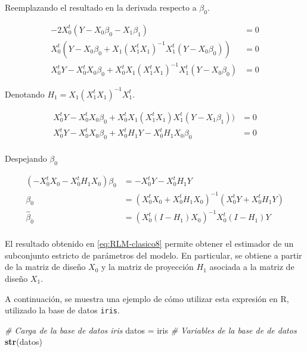\documentclass[
  11pt,
]{book}
\newenvironment{Shaded}{\begin{snugshade}}{\end{snugshade}}
\newcommand{\CommentTok}[1]{\textcolor[rgb]{0.56,0.35,0.01}{\textit{#1}}}
\newcommand{\FunctionTok}[1]{\textcolor[rgb]{0.13,0.29,0.53}{\textbf{#1}}}
\newcommand{\NormalTok}[1]{#1}
\newcommand{\OtherTok}[1]{\textcolor[rgb]{0.56,0.35,0.01}{#1}}
\theoremstyle{definition}
\theoremstyle{definition}
\theoremstyle{definition}
\theoremstyle{definition}
\theoremstyle{remark}
\begin{document}
Reemplazando el resultado en la derivada respecto a \(\beta_0\).

\begin{equation}
\begin{split}
-2X^t_0(Y-X_0\beta_0-X_1\beta_1) &= 0\\
X^t_0(Y-X_0\beta_0+X_1(X_1^tX_1)^{-1}X_1^t(Y-X_0\beta_0)) &= 0\\
X^t_0Y-X^t_0X_0\beta_0+X^t_0X_1(X_1^tX_1)^{-1}X_1^t(Y-X_0\beta_0) &= 0
\end{split}
\label{eq:RLM-clasico6}
\end{equation}

Denotando \(H_1 = X_1(X_1^tX_1)^{-1}X_1^t\).

\begin{equation}
\begin{split}
X^t_0Y-X^t_0X_0\beta_0+X^t_0X_1(X_1^tX_1)X_1^t(Y-X_1\beta_1)) &= 0\\
X^t_0Y-X^t_0X_0\beta_0+X^t_0H_1Y-X^t_0H_1X_0\beta_0 &= 0\\
\end{split}
\label{eq:RLM-clasico7}
\end{equation}

Despejando \(\beta_0\)

\begin{equation}
\begin{split}
(-X^t_0X_0-X^t_0H_1X_0)\beta_0 &= -X^t_0Y - X^t_0H_1Y\\
\beta_0 &= (X^t_0X_0 + X^t_0H_1X_0)^{-1}(X^t_0Y + X^t_0H_1Y)\\
\widehat{\beta}_0 &= (X^t_0(I-H_1)X_0)^{-1}X^t_0(I-H_1)Y\\
\end{split}
\label{eq:RLM-clasico8}
\end{equation}

El resultado obtenido en \eqref{eq:RLM-clasico8} permite obtener el estimador de un subconjunto estricto de parámetros del modelo. En particular, se obtiene a partir de la matriz de diseño \(X_0\) y la matriz de proyección \(H_1\) asociada a la matriz de diseño \(X_1\).

A continuación, se muestra una ejemplo de cómo utilizar esta expresión en R, utilizado la base de datos \texttt{iris}.

\begin{Shaded}
\begin{Highlighting}[]
\CommentTok{\# Carga de la base de datos iris}
\NormalTok{datos }\OtherTok{=}\NormalTok{ iris}
\CommentTok{\# Variables de la base de de datos}
\FunctionTok{str}\NormalTok{(datos)}
\end{Highlighting}
\end{Shaded}
\end{document}
